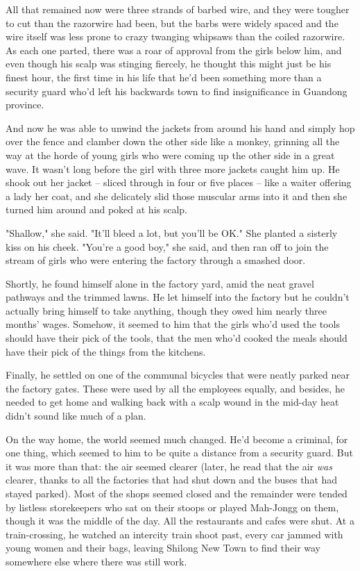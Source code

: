 All that remained now were three strands of barbed wire, and they
were tougher to cut than the razorwire had been, but the barbs were
widely spaced and the wire itself was less prone to crazy twanging
whipsaws than the coiled razorwire. As each one parted, there was a
roar of approval from the girls below him, and even though his
scalp was stinging fiercely, he thought this might just be his
finest hour, the first time in his life that he'd been something
more than a security guard who'd left his backwards town to find
insignificance in Guandong province.

And now he was able to unwind the jackets from around his hand and
simply hop over the fence and clamber down the other side like a
monkey, grinning all the way at the horde of young girls who were
coming up the other side in a great wave. It wasn't long before the
girl with three more jackets caught him up. He shook out her jacket
-- sliced through in four or five places -- like a waiter offering
a lady her coat, and she delicately slid those muscular arms into
it and then she turned him around and poked at his scalp.

"Shallow," she said. "It'll bleed a lot, but you'll be OK." She
planted a sisterly kiss on his cheek. "You're a good boy," she
said, and then ran off to join the stream of girls who were
entering the factory through a smashed door.

Shortly, he found himself alone in the factory yard, amid the neat
gravel pathways and the trimmed lawns. He let himself into the
factory but he couldn't actually bring himself to take anything,
though they owed him nearly three months' wages. Somehow, it seemed
to him that the girls who'd used the tools should have their pick
of the tools, that the men who'd cooked the meals should have their
pick of the things from the kitchens.

Finally, he settled on one of the communal bicycles that were
neatly parked near the factory gates. These were used by all the
employees equally, and besides, he needed to get home and walking
back with a scalp wound in the mid-day heat didn't sound like much
of a plan.

On the way home, the world seemed much changed. He'd become a
criminal, for one thing, which seemed to him to be quite a distance
from a security guard. But it was more than that: the air seemed
clearer (later, he read that the air \emph{was} clearer, thanks to
all the factories that had shut down and the buses that had stayed
parked). Most of the shops seemed closed and the remainder were
tended by listless storekeepers who sat on their stoops or played
Mah-Jongg on them, though it was the middle of the day. All the
restaurants and cafes were shut. At a train-crossing, he watched an
intercity train shoot past, every car jammed with young women and
their bags, leaving Shilong New Town to find their way somewhere
else where there was still work.

